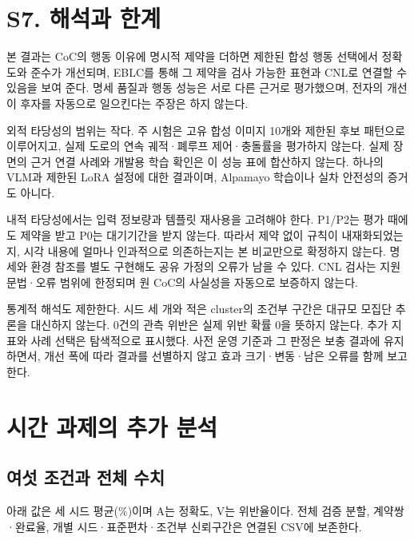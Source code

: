 \documentclass[11pt,a4paper]{article}
\begin{document}
\section*{S7. 해석과 한계}

본 결과는 CoC의 행동 이유에 명시적 제약을 더하면 제한된 합성 행동 선택에서 정확도와 준수가 개선되며, EBLC를 통해 그 제약을 검사 가능한 표현과 CNL로 연결할 수 있음을 보여 준다. 명세 품질과 행동 성능은 서로 다른 근거로 평가했으며, 전자의 개선이 후자를 자동으로 일으킨다는 주장은 하지 않는다.\par

외적 타당성의 범위는 작다. 주 시험은 고유 합성 이미지 10개와 제한된 후보 패턴으로 이루어지고, 실제 도로의 연속 궤적·폐루프 제어·충돌률을 평가하지 않는다. 실제 장면의 근거 연결 사례와 개발용 학습 확인은 이 성능 표에 합산하지 않는다. 하나의 VLM과 제한된 LoRA 설정에 대한 결과이며, Alpamayo 학습이나 실차 안전성의 증거도 아니다.\par

내적 타당성에서는 입력 정보량과 템플릿 재사용을 고려해야 한다. P1/P2는 평가 때에도 제약을 받고 P0는 대기기간을 받지 않는다. 따라서 제약 없이 규칙이 내재화되었는지, 시각 내용에 얼마나 인과적으로 의존하는지는 본 비교만으로 확정하지 않는다. 명세와 환경 참조를 별도 구현해도 공유 가정의 오류가 남을 수 있다. CNL 검사는 지원 문법·오류 범위에 한정되며 원 CoC의 사실성을 자동으로 보증하지 않는다.\par

통계적 해석도 제한한다. 시드 세 개와 적은 cluster의 조건부 구간은 대규모 모집단 추론을 대신하지 않는다. 0건의 관측 위반은 실제 위반 확률 0을 뜻하지 않는다. 추가 지표와 사례 선택은 탐색적으로 표시했다. 사전 운영 기준과 그 판정은 보충 결과에 유지하면서, 개선 폭에 따라 결과를 선별하지 않고 효과 크기·변동·남은 오류를 함께 보고한다.\par

\section*{시간 과제의 추가 분석}

\subsection*{여섯 조건과 전체 수치}

아래 값은 세 시드 평균(\%)이며 A는 정확도, V는 위반율이다. 전체 검증 분할, 계약쌍·완료율, 개별 시드·표준편차·조건부 신뢰구간은 연결된 CSV에 보존한다.\par
\end{document}
